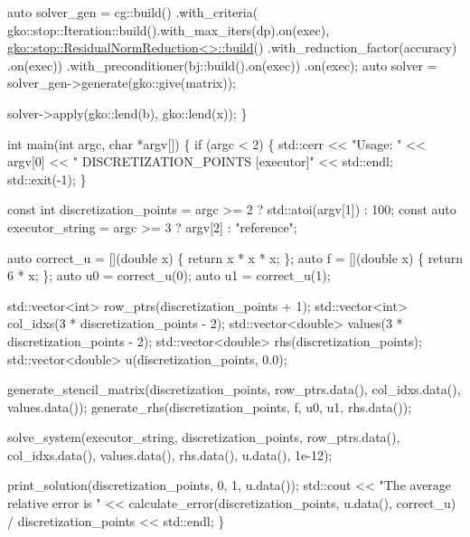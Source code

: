 \begin{DoxyCodeInclude}
    \textcolor{keyword}{auto} solver\_gen =
        cg::build()
            .with\_criteria(
                gko::stop::Iteration::build().with\_max\_iters(dp).on(exec),
                \hyperlink{classgko_1_1stop_1_1ResidualNormReduction}{gko::stop::ResidualNormReduction<>::build}()
                    .with\_reduction\_factor(accuracy)
                    .on(exec))
            .with\_preconditioner(bj::build().on(exec))
            .on(exec);
    \textcolor{keyword}{auto} solver = solver\_gen->generate(gko::give(matrix));

    solver->apply(gko::lend(b), gko::lend(x));
\}


\textcolor{keywordtype}{int} main(\textcolor{keywordtype}{int} argc, \textcolor{keywordtype}{char} *argv[])
\{
    \textcolor{keywordflow}{if} (argc < 2) \{
        std::cerr << \textcolor{stringliteral}{"Usage: "} << argv[0] << \textcolor{stringliteral}{" DISCRETIZATION\_POINTS [executor]"}
                  << std::endl;
        std::exit(-1);
    \}

    \textcolor{keyword}{const} \textcolor{keywordtype}{int} discretization\_points = argc >= 2 ? std::atoi(argv[1]) : 100;
    \textcolor{keyword}{const} \textcolor{keyword}{auto} executor\_string = argc >= 3 ? argv[2] : \textcolor{stringliteral}{"reference"};

    \textcolor{keyword}{auto} correct\_u = [](\textcolor{keywordtype}{double} x) \{ \textcolor{keywordflow}{return} x * x * x; \};
    \textcolor{keyword}{auto} f = [](\textcolor{keywordtype}{double} x) \{ \textcolor{keywordflow}{return} 6 * x; \};
    \textcolor{keyword}{auto} u0 = correct\_u(0);
    \textcolor{keyword}{auto} u1 = correct\_u(1);

    std::vector<int> row\_ptrs(discretization\_points + 1);
    std::vector<int> col\_idxs(3 * discretization\_points - 2);
    std::vector<double> values(3 * discretization\_points - 2);
    std::vector<double> rhs(discretization\_points);
    std::vector<double> u(discretization\_points, 0.0);

    generate\_stencil\_matrix(discretization\_points, row\_ptrs.data(),
                            col\_idxs.data(), values.data());
    generate\_rhs(discretization\_points, f, u0, u1, rhs.data());

    solve\_system(executor\_string, discretization\_points, row\_ptrs.data(),
                 col\_idxs.data(), values.data(), rhs.data(), u.data(), 1e-12);

    print\_solution(discretization\_points, 0, 1, u.data());
    std::cout << \textcolor{stringliteral}{"The average relative error is "}
              << calculate\_error(discretization\_points, u.data(), correct\_u) /
                     discretization\_points
              << std::endl;
\}
\end{DoxyCodeInclude}
 